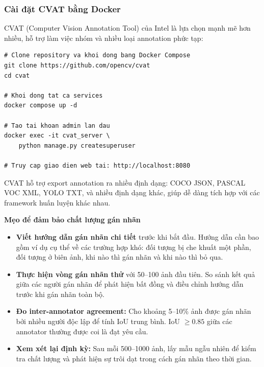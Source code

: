 \subsubsection{Cài đặt CVAT bằng Docker}

CVAT (Computer Vision Annotation Tool) của Intel là lựa chọn mạnh mẽ hơn nhiều, hỗ trợ làm việc nhóm và nhiều loại annotation phức tạp:

\begin{verbatim}
# Clone repository va khoi dong bang Docker Compose
git clone https://github.com/opencv/cvat
cd cvat

# Khoi dong tat ca services
docker compose up -d

# Tao tai khoan admin lan dau
docker exec -it cvat_server \
    python manage.py createsuperuser

# Truy cap giao dien web tai: http://localhost:8080
\end{verbatim}

CVAT hỗ trợ export annotation ra nhiều định dạng: COCO JSON, PASCAL VOC XML, YOLO TXT, và nhiều định dạng khác, giúp dễ dàng tích hợp với các framework huấn luyện khác nhau.

\begin{mdframed}[style=infobox]
    \textbf{Mẹo để đảm bảo chất lượng gán nhãn}

    \begin{itemize}
        \item \textbf{Viết hướng dẫn gán nhãn chi tiết} trước khi bắt đầu. Hướng dẫn cần bao gồm ví dụ cụ thể về các trường hợp khó: đối tượng bị che khuất một phần, đối tượng ở biên ảnh, khi nào thì gán nhãn và khi nào thì bỏ qua.

        \item \textbf{Thực hiện vòng gán nhãn thử} với 50--100 ảnh đầu tiên. So sánh kết quả giữa các người gán nhãn để phát hiện bất đồng và điều chỉnh hướng dẫn trước khi gán nhãn toàn bộ.

        \item \textbf{Đo inter-annotator agreement:} Cho khoảng 5--10\% ảnh được gán nhãn bởi nhiều người độc lập để tính IoU trung bình. IoU $\geq 0.85$ giữa các annotator thường được coi là đạt yêu cầu.

        \item \textbf{Xem xét lại định kỳ:} Sau mỗi 500--1000 ảnh, lấy mẫu ngẫu nhiên để kiểm tra chất lượng và phát hiện sự trôi dạt trong cách gán nhãn theo thời gian.
    \end{itemize}
\end{mdframed}
